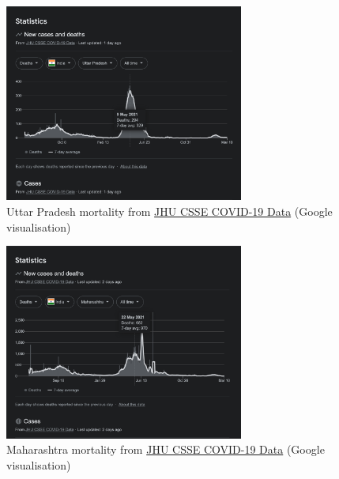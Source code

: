 \documentclass[11pt,a4paper,notitlepage]{report}
\begin{document}
\begin{figure}[h]
    \centering
    \includegraphics[width=0.7\textwidth]{india-uttarpradesh-mortality}
    \caption{Uttar Pradesh mortality from \href{https://github.com/CSSEGISandData/COVID-19}{JHU CSSE COVID-19 Data} (Google visualisation)}
    \label{fig:india-uttarpradesh-mortality}
\end{figure}

\begin{figure}[h]
    \centering
    \includegraphics[width=0.7\textwidth]{india-maharashtra-mortality}
    \caption{Maharashtra mortality from \href{https://github.com/CSSEGISandData/COVID-19}{JHU CSSE COVID-19 Data} (Google visualisation)}
    \label{fig:india-maharashtra-mortality}
\end{figure}
\end{document}
